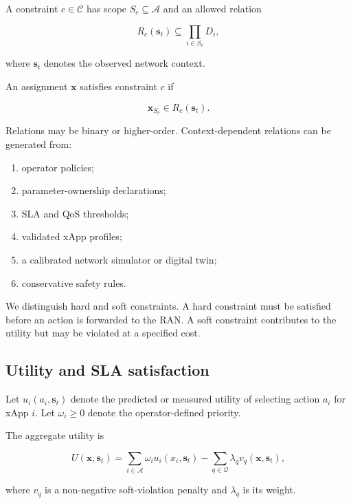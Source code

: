 \documentclass[pdflatex,sn-mathphys-num,iicol,oneside]{sn-jnl}
\begin{document}
A constraint $c\in\mathcal{C}$ has scope
$S_c\subseteq\mathcal{A}$ and an allowed relation

\begin{equation}
R_c(\bm{s}_t)
\subseteq
\prod_{i\in S_c}D_i,
\end{equation}

where $\bm{s}_t$ denotes the observed network context.

An assignment $\bm{x}$ satisfies constraint $c$ if

\begin{equation}
\bm{x}_{S_c}\in R_c(\bm{s}_t).
\end{equation}

Relations may be binary or higher-order. Context-dependent relations
can be generated from:

\begin{enumerate}
    \item operator policies;
    \item parameter-ownership declarations;
    \item SLA and QoS thresholds;
    \item validated xApp profiles;
    \item a calibrated network simulator or digital twin;
    \item conservative safety rules.
\end{enumerate}

We distinguish hard and soft constraints. A hard constraint must be
satisfied before an action is forwarded to the RAN. A soft constraint
contributes to the utility but may be violated at a specified cost.

\subsection{Utility and SLA satisfaction}

Let $u_i(a_i,\bm{s}_t)$ denote the predicted or measured utility of
selecting action $a_i$ for xApp $i$. Let
$\omega_i\geq 0$ denote the operator-defined priority.

The aggregate utility is

\begin{equation}
U(\bm{x},\bm{s}_t)
=
\sum_{i\in\mathcal{A}}
\omega_i u_i(x_i,\bm{s}_t)
-
\sum_{q\in\mathcal{Q}}
\lambda_q
v_q(\bm{x},\bm{s}_t),
\label{eq:utility}
\end{equation}

where $v_q$ is a non-negative soft-violation penalty and
$\lambda_q$ is its weight.
\end{document}

